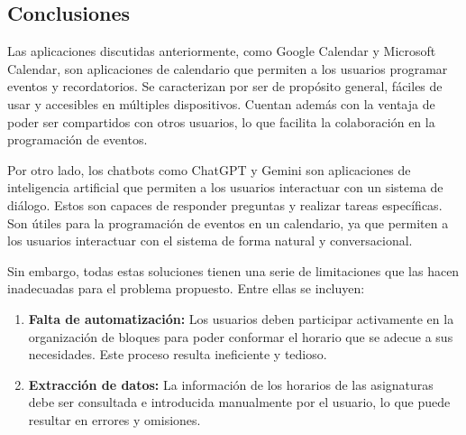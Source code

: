 \newpage
\subsection{Conclusiones}
Las aplicaciones discutidas anteriormente, como Google Calendar y Microsoft Calendar, son aplicaciones de calendario que permiten a los usuarios programar eventos y recordatorios. Se caracterizan por ser de propósito general, fáciles de usar y accesibles en múltiples dispositivos. Cuentan además con la ventaja de poder ser compartidos con otros usuarios, lo que facilita la colaboración en la programación de eventos.\newline

Por otro lado, los chatbots como ChatGPT y Gemini son aplicaciones de inteligencia artificial que permiten a los usuarios interactuar con un sistema de diálogo. Estos son capaces de responder preguntas y realizar tareas específicas. Son útiles para la programación de eventos en un calendario, ya que permiten a los usuarios interactuar con el sistema de forma natural y conversacional.\newline

Sin embargo, todas estas soluciones tienen una serie de limitaciones que las hacen inadecuadas para el problema propuesto. Entre ellas se incluyen:

\begin{enumerate}
    \item \textbf{Falta de automatización:} Los usuarios deben participar activamente en la organización de bloques para poder conformar el horario que se adecue a sus necesidades. Este proceso resulta ineficiente y tedioso.
    \item \textbf{Extracción de datos:} La información de los horarios de las asignaturas debe ser consultada e introducida manualmente por el usuario, lo que puede resultar en errores y omisiones.
\end{enumerate}